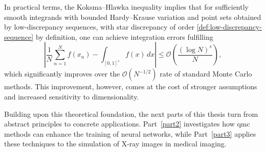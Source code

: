 In practical terms, the Koksma--Hlawka inequality implies that for sufficiently
smooth integrands with bounded Hardy--Krause variation and point sets obtained
by low-discrepancy sequences, with star discrepancy of order
\eqref{def:low-discrepancy-sequence} by definition, one can achieve integration
errors fulfilling 
\begin{equation*}
    \left| \frac{1}{N} \sum_{n=1}^N f(x_n) - \int_{[0,1]^s} f(x) \, dx \right|\leq \mathcal{O}\left( \frac{(\log N)^s}{N} \right),
\end{equation*}
which significantly improves over the $\mathcal{O}(N^{-1/2})$ rate of standard
Monte Carlo methods. This improvement, however, comes at the cost of stronger
assumptions and increased sensitivity to dimensionality.

\qquad

Building upon this theoretical foundation, the next parts of this thesis turn
from abstract principles to concrete applications. Part~\ref{part2} investigates
how \ac{qmc} methods can enhance the training of neural networks, while
Part~\ref{part3} applies these techniques to the simulation of X-ray images in
medical imaging.










